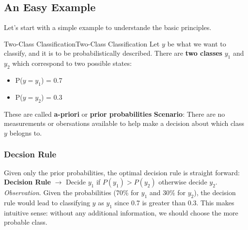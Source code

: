 \documentclass[a4paper]{article}
\theoremstyle{definition}
\begin{document}
\subsection{An Easy Example}
Let's start with a simple example to understande the basic principles.
\begin{example}{Two-Class Classification}{Two-Class Classification}
Let \( y \) be what we want to classify, and it is to be probabilistically described.
\vspace{1em}
\noindent
\newline
There are \textbf{two classes} \( y_1 \) and \( y_2 \) which correspond to two possible states:
\begin{itemize}
    \item [a)] P(\(y = y_1 \)) = 0.7
    \item [b)] P(\(y = y_2 \)) = 0.3
\end{itemize}
These are called \textbf{a-priori} or \textbf{prior probabilities}
\vspace{1em}
\noindent
\newline
\textbf{Scenario}: There are no measurements or obersations available to help make a decision about which class \( y \) belogns to.
\end{example}
\subsubsection{Decsion Rule}
Given only the prior probabilities, the optimal decision rule is straight forward:
\textbf{Decision Rule} \( \rightarrow \) Decide \( y_1 \) if \( P(y_1) > P(y_2) \) otherwise decide \( y_2 \).
\vspace{1em}
\noindent
\newline
\textit{Observation}. Given the probabilities (70\% for \( y_1 \) and 30\% for \( y_2 \)), the decision rule would lead to classifying \( y \) as \( y_1 \) since 0.7 
is greater than 0.3.
\vspace{1em}
\noindent
\newline
This makes intuitive sense: without any additional information, we should choose the more probable class.
\end{document}
